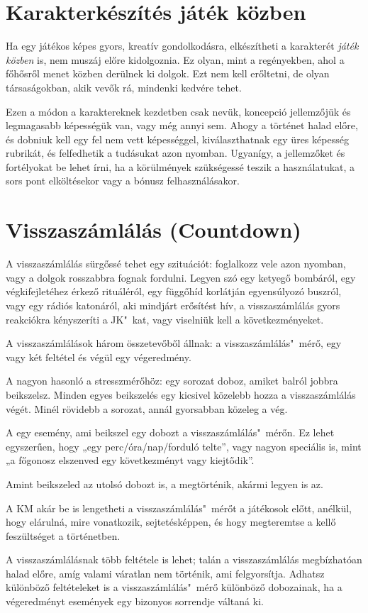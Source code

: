 \section{Karakterkészítés játék közben}

Ha egy játékos képes gyors, kreatív gondolkodásra, elkészítheti a karakterét \emph{játék közben} is, nem muszáj előre kidolgoznia. Ez olyan, mint a regényekben, ahol a főhősről menet közben derülnek ki dolgok. Ezt nem kell erőltetni, de olyan társaságokban, akik vevők rá, mindenki kedvére tehet.

Ezen a módon a karaktereknek kezdetben csak nevük, koncepció jellemzőjük és legmagasabb képességük van, vagy még annyi sem. Ahogy a történet halad előre, és dobniuk kell egy fel nem vett képességgel, kiválaszthatnak egy üres képesség rubrikát, és felfedhetik a tudásukat azon nyomban. Ugyanígy, a jellemzőket és fortélyokat be lehet írni, ha a körülmények szükségessé teszik a használatukat, a sors pont elköltésekor vagy a bónusz felhasználásakor.

\section[Visszaszámlálás]{Visszaszámlálás (Countdown)}

A visszaszámlálás sürgőssé tehet egy szituációt: foglalkozz vele azon nyomban, vagy a dolgok rosszabbra fognak fordulni. Legyen szó egy ketyegő bombáról, egy végkifejletéhez érkező rituáléról, egy függőhíd korlátján egyensúlyozó buszról, vagy egy rádiós katonáról, aki mindjárt erősítést hív, a visszaszámlálás gyors reakciókra kényszeríti a JK"~kat, vagy viselniük kell a következményeket.

A visszaszámlálások három összetevőből állnak: a visszaszámlálás"~mérő, egy vagy két feltétel és végül egy végeredmény.

A  nagyon hasonló a stresszmérőhöz: egy sorozat doboz, amiket balról jobbra beikszelsz. Minden egyes beikszelés egy kicsivel közelebb hozza a visszaszámlálás végét. Minél rövidebb a sorozat, annál gyorsabban közeleg a vég.

A  egy esemény, ami beikszel egy dobozt a visszaszámlálás"~mérőn. Ez lehet egyszerűen, hogy „egy perc/óra/nap/forduló telte”, vagy nagyon speciális is, mint „a főgonosz elszenved egy következményt vagy kiejtődik”.

Amint beikszeled az utolsó dobozt is, a  megtörténik, akármi legyen is az.

A KM akár be is lengetheti a visszaszámlálás"~mérőt a játékosok előtt, anélkül, hogy elárulná, mire vonatkozik, sejtetésképpen, és hogy megteremtse a kellő feszültséget a történetben.

A visszaszámlálásnak több feltétele is lehet; talán a visszaszámlálás megbízhatóan halad előre, amíg valami váratlan nem történik, ami felgyorsítja. Adhatsz különböző feltételeket is a visszaszámlálás"~mérő különböző dobozainak, ha a végeredményt események egy bizonyos sorrendje váltaná ki.
